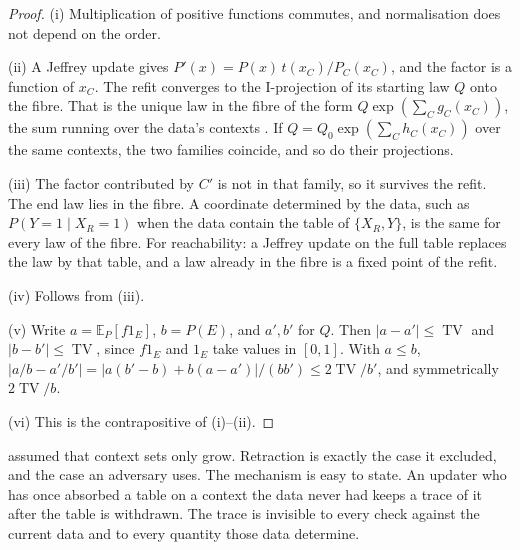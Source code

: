 \documentclass[11pt]{article}
\theoremstyle{definition}\newtheorem{definition}[theorem]{Definition}\newtheorem{remark}[theorem]{Remark}\newtheorem{example}[theorem]{Example}\newtheorem{problem}[theorem]{Open problem}\crefname{problem}{Problem}{Problems}
\begin{document}
\begin{proof}
(i) Multiplication of positive functions commutes, and normalisation does not depend on the order.

(ii) A Jeffrey update gives $P'(x)=P(x)\,t(x_C)/P_C(x_C)$, and the factor is a function of $x_C$. The refit converges to the I-projection of its starting law $Q$ onto the fibre. That is the unique law in the fibre of the form $Q\exp(\sum_Cg_C(x_C))$, the sum running over the data's contexts \cite{Csiszar1975}. If $Q=Q_0\exp(\sum_Ch_C(x_C))$ over the same contexts, the two families coincide, and so do their projections.

(iii) The factor contributed by $C'$ is not in that family, so it survives the refit. The end law lies in the fibre. A coordinate determined by the data, such as $P(Y{=}1\mid X_R{=}1)$ when the data contain the table of $\{X_R,Y\}$, is the same for every law of the fibre. For reachability: a Jeffrey update on the full table replaces the law by that table, and a law already in the fibre is a fixed point of the refit.

(iv) Follows from (iii).

(v) Write $a=\mathbb E_P[f1_E]$, $b=P(E)$, and $a',b'$ for $Q$. Then $|a-a'|\le\operatorname{TV}$ and $|b-b'|\le\operatorname{TV}$, since $f1_E$ and $1_E$ take values in $[0,1]$. With $a\le b$, $|a/b-a'/b'|=|a(b'-b)+b(a-a')|/(bb')\le 2\operatorname{TV}/b'$, and symmetrically $2\operatorname{TV}/b$.

(vi) This is the contrapositive of (i)--(ii).
\end{proof}

 assumed that context sets only grow. Retraction is exactly the case it excluded, and the case an adversary uses. The mechanism is easy to state. An updater who has once absorbed a table on a context the data never had keeps a trace of it after the table is withdrawn. The trace is invisible to every check against the current data and to every quantity those data determine.
\end{document}
